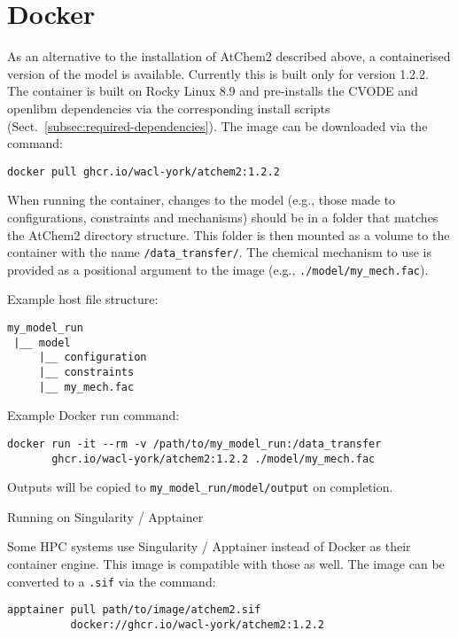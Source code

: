 \section{Docker} \label{sec:docker}

As an alternative to the installation of AtChem2 described above, a
containerised version of the model is available. Currently this is
built only for version 1.2.2. The container is built on Rocky Linux 8.9
and pre-installs the CVODE and openlibm dependencies via the corresponding
install scripts (Sect.~\ref{subsec:required-dependencies}).
The image can be downloaded via the command:

\begin{verbatim}
docker pull ghcr.io/wacl-york/atchem2:1.2.2
\end{verbatim}

When running the container, changes to the model (e.g., those made to
configurations, constraints and mechanisms) should be in a folder that
matches the AtChem2 directory structure. This folder is then mounted
as a volume to the container with the name \texttt{/data\_transfer/}.
The chemical mechanism to use is provided as a positional argument to
the image (e.g., \texttt{./model/my\_mech.fac}).

Example host file structure:
\begin{verbatim}
my_model_run
 |__ model
     |__ configuration
     |__ constraints
     |__ my_mech.fac
\end{verbatim}

Example Docker run command:

\begin{verbatim}
docker run -it --rm -v /path/to/my_model_run:/data_transfer
       ghcr.io/wacl-york/atchem2:1.2.2 ./model/my_mech.fac
\end{verbatim}

Outputs will be copied to \texttt{my\_model\_run/model/output} on completion.

Running on Singularity / Apptainer

Some HPC systems use Singularity / Apptainer instead of Docker as
their container engine. This image is compatible with those
as well. The image can be converted to a \texttt{.sif} via the command:

\begin{verbatim}
apptainer pull path/to/image/atchem2.sif
          docker://ghcr.io/wacl-york/atchem2:1.2.2
\end{verbatim}

